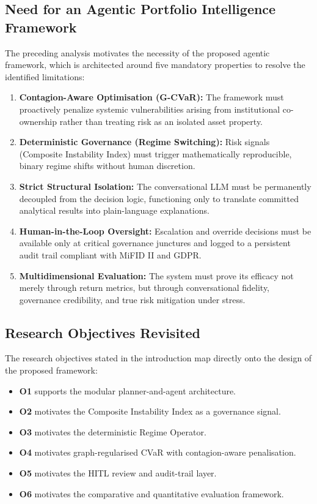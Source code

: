 \documentclass[11pt]{article}
\begin{document}
\subsection{Need for an Agentic Portfolio Intelligence Framework}
The preceding analysis motivates the necessity of the proposed agentic framework, which is architected around five mandatory properties to resolve the identified limitations:
\begin{enumerate}
  \item \textbf{Contagion-Aware Optimisation (G-CVaR):} The framework must proactively penalize systemic vulnerabilities arising from institutional co-ownership rather than treating risk as an isolated asset property.
  \item \textbf{Deterministic Governance (Regime Switching):} Risk signals (Composite Instability Index) must trigger mathematically reproducible, binary regime shifts without human discretion.
  \item \textbf{Strict Structural Isolation:} The conversational LLM must be permanently decoupled from the decision logic, functioning only to translate committed analytical results into plain-language explanations.
  \item \textbf{Human-in-the-Loop Oversight:} Escalation and override decisions must be available only at critical governance junctures and logged to a persistent audit trail compliant with MiFID II and GDPR.
  \item \textbf{Multidimensional Evaluation:} The system must prove its efficacy not merely through return metrics, but through conversational fidelity, governance credibility, and true risk mitigation under stress.
\end{enumerate}

\subsection{Research Objectives Revisited}
The research objectives stated in the introduction map directly onto the design of the proposed framework:
\begin{itemize}
  \item \textbf{O1} supports the modular planner-and-agent architecture.
  \item \textbf{O2} motivates the Composite Instability Index as a governance signal.
  \item \textbf{O3} motivates the deterministic Regime Operator.
  \item \textbf{O4} motivates graph-regularised CVaR with contagion-aware penalisation.
  \item \textbf{O5} motivates the HITL review and audit-trail layer.
  \item \textbf{O6} motivates the comparative and quantitative evaluation framework.
\end{itemize}
\end{document}
